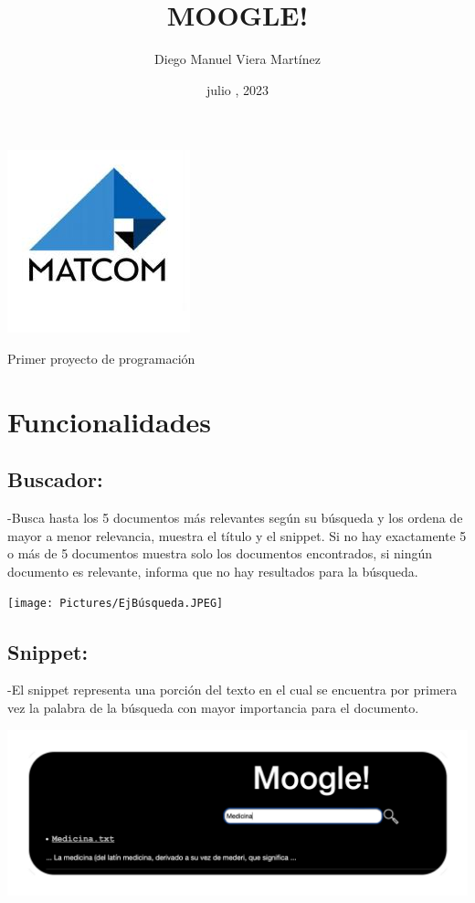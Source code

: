 \documentclass[a4paper,12pt]{article}
\begin{document}
    \title{\huge \textbf{MOOGLE!}}
    \author{Diego Manuel Viera Martínez}
    \date{julio , 2023}
    \maketitle
    \begin{center}
        \includegraphics[scale=0.7]{Pictures/matcom.jpg}
        \label{fig:logo}
    \end{center}
    \begin{center}
        \large Primer proyecto de programación
    \end{center}
    \newpage 
    \section{Funcionalidades}\label{sec:Funcionalidades}
    \subsection{Buscador:}\label{sub:Buscador}
    -Busca hasta los 5 documentos más relevantes según su búsqueda y los
    ordena de mayor a menor relevancia, muestra el título y el snippet.
    Si no hay exactamente 5 o más de 5 documentos muestra solo los documentos 
    encontrados, si ningún documento es relevante, informa que no hay resultados para la búsqueda.

    \begin{center}
        \texttt{[image: Pictures/EjBúsqueda.JPEG]}
    \end{center}

    \subsection{Snippet:}\label{sub:Snippet}
    -El snippet representa una porción del texto
    en el cual se encuentra por primera vez la palabra de la búsqueda
    con mayor importancia para el documento.
    
    \begin{center}
        \includegraphics[scale=0.2]{Pictures/EjSnippet.JPEG}
    \end{center}
\end{document}
